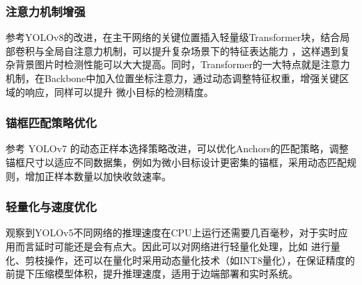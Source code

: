 \documentclass[UTF8]{ctexart}
\begin{document}
\subsubsection{注意力机制增强}
参考YOLOv8的改进，在主干网络的关键位置插入轻量级Transformer块，结合局部卷积与全局自注意力机制，可以提升复杂场景下的特征表达能力
，这样遇到复杂背景图片时检测性能可以大大提高。同时，Transformer的一大特点就是注意力机制，在Backbone中加入位置坐标注意力，通过动态调整特征权重，增强关键区域的响应，同样可以提升
微小目标的检测精度。

\subsubsection{锚框匹配策略优化}
参考 YOLOv7 的动态正样本选择策略改进，可以优化Anchors的匹配策略，调整锚框尺寸以适应不同数据集，例如为微小目标设计更密集的锚框，采用动态匹配规则，增加正样本数量以加快收敛速率。


\subsubsection{轻量化与速度优化}
观察到YOLOv5不同网络的推理速度在CPU上运行还需要几百毫秒，对于实时应用而言延时可能还是会有点大。因此可以对网络进行轻量化处理，比如
进行量化、剪枝操作，还可以在量化时采用动态量化技术（如INT8量化），在保证精度的前提下压缩模型体积，提升推理速度，适用于边端部署和实时系统。


\newpage
\end{document}
